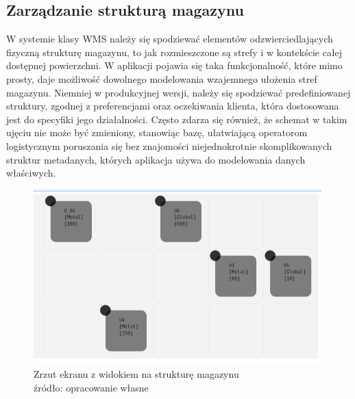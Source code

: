 	\subsection{Zarządzanie strukturą magazynu}
		W systemie klasy WMS należy się spodziewać elementów odzwierciedlających fizyczną strukturę magazynu,
		to jak rozmieszczone są strefy i w kontekście całej dostępnej powierzchni. W aplikacji pojawia się taka
		funkcjonalność, które mimo prosty, daje możliwość dowolnego modelowania wzajemnego ułożenia stref
		magazynu. Niemniej w produkcyjnej wersji, należy się spodziewać predefiniowanej struktury, zgodnej z
		preferencjami oraz oczekiwania klienta, która dostosowana jest do specyfiki jego działalności. Często
		zdarza się również, że schemat w takim ujęciu nie może być zmieniony, stanowiąc bazę, ułatwiającą
		operatorom logistycznym poruszania się bez znajomości niejednokrotnie skomplikowanych struktur metadanych, których
		aplikacja używa do modelowania danych właściwych.
		\vspace{-15pt}
		\begin{figure}[H]
			\centering
			\includegraphics[width=0.99\textwidth]{images/app/unit_preview}
			\caption[Aplikacja - Zarządzania strukturą magazynu]{
				Zrzut ekranu z widokiem na strukturę magazynu \\
				źródło: opracowanie własne
			}
			\label{c7:fig:app:unit_preview}
		\end{figure}
